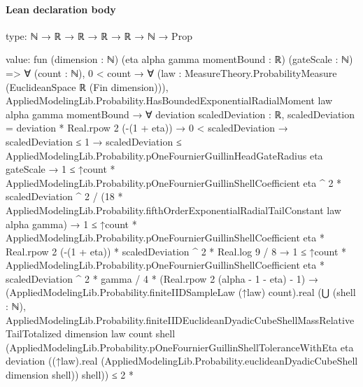\documentclass[10pt]{article}
\begin{document}
\paragraph{Lean declaration body}
\begin{ReviewVerbatim}
type:
ℕ → ℝ → ℝ → ℝ → ℝ → ℕ → Prop

value:
fun (dimension : ℕ) (eta alpha gamma momentBound : ℝ) (gateScale : ℕ) =>
  ∀ (count : ℕ),
    0 < count →
      ∀ (law : MeasureTheory.ProbabilityMeasure (EuclideanSpace ℝ (Fin dimension))),
        AppliedModelingLib.Probability.HasBoundedExponentialRadialMoment law alpha gamma momentBound →
          ∀ {deviation scaledDeviation : ℝ},
            scaledDeviation = deviation * Real.rpow 2 (-(1 + eta)) →
              0 < scaledDeviation →
                scaledDeviation ≤ 1 →
                  scaledDeviation ≤ AppliedModelingLib.Probability.pOneFournierGuillinHeadGateRadius eta gateScale →
                    1 ≤
                        ↑count * AppliedModelingLib.Probability.pOneFournierGuillinShellCoefficient eta ^ 2 *
                            scaledDeviation ^ 2 /
                          (18 *
                            AppliedModelingLib.Probability.fifthOrderExponentialRadialTailConstant law alpha gamma) →
                      1 ≤
                          ↑count * AppliedModelingLib.Probability.pOneFournierGuillinShellCoefficient eta *
                                  Real.rpow 2 (-(1 + eta)) *
                                scaledDeviation ^ 2 *
                              Real.log 9 /
                            8 →
                        1 ≤
                            ↑count * AppliedModelingLib.Probability.pOneFournierGuillinShellCoefficient eta *
                                    scaledDeviation ^ 2 *
                                  gamma /
                                4 *
                              (Real.rpow 2 (alpha - 1 - eta) - 1) →
                          (AppliedModelingLib.Probability.finiteIIDSampleLaw (↑law) count).real
                              (⋃ (shell : ℕ),
                                AppliedModelingLib.Probability.finiteIIDEuclideanDyadicCubeShellMassRelativeTailTotalized
                                  dimension law count shell
                                  (AppliedModelingLib.Probability.pOneFournierGuillinShellToleranceWithEta eta deviation
                                    ((↑law).real
                                      (AppliedModelingLib.Probability.euclideanDyadicCubeShell dimension shell))
                                    shell)) ≤
                            2 *

\end{ReviewVerbatim}
\end{document}

